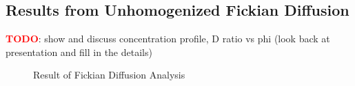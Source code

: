 
\subsection{Results from Unhomogenized Fickian Diffusion}\label{subsec:results_unhom_fick}

\textcolor{red}{\textbf{TODO}}: show and discuss concentration profile, D ratio vs phi
(look back at presentation and fill in the details)

\begin{figure}[H]
\centering
{}
\caption{Result of Fickian Diffusion Analysis}
\label{fig:uh_fick_D_vs_phi}
\end{figure}
